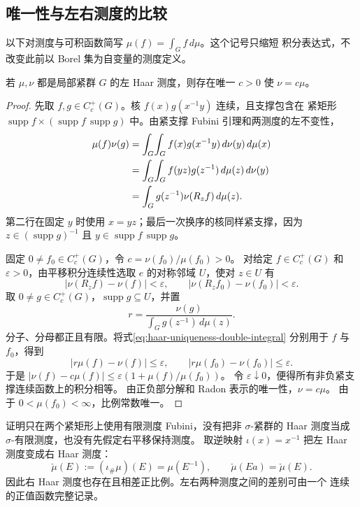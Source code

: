\subsection{唯一性与左右测度的比较}

以下对测度与可积函数简写 $\mu(f)=\int_G f\,d\mu$。这个记号只缩短
积分表达式，不改变此前以 Borel 集为自变量的测度定义。

\begin{theorem}
\label{thm:haar-uniqueness}
若 $\mu,\nu$ 都是局部紧群 $G$ 的左 Haar 测度，则存在唯一 $c>0$
使 $\nu=c\mu$。
\end{theorem}

\begin{proof}
先取 $f,g\in C_c^+(G)$。核 $f(x)g(x^{-1}y)$ 连续，且支撑包含在
紧矩形
$\operatorname{supp}f\times(\operatorname{supp}f\,\operatorname{supp}g)$
中。由紧支撑 Fubini 引理和两测度的左不变性，
\begin{align}
 \mu(f)\nu(g)
 &=\int_G\!\int_G f(x)g(x^{-1}y)\,d\nu(y)\,d\mu(x)\notag\\
 &=\int_G\!\int_G f(yz)g(z^{-1})\,d\mu(z)\,d\nu(y)\notag\\
 &=\int_G g(z^{-1})\nu(R_zf)\,d\mu(z).
 \label{eq:haar-uniqueness-double-integral}
\end{align}
第二行在固定 $y$ 时使用 $x=yz$；最后一次换序的核同样紧支撑，因为
$z\in(\operatorname{supp}g)^{-1}$ 且
$y\in\operatorname{supp}f\,\operatorname{supp}g$。

固定 $0\ne f_0\in C_c^+(G)$，令 $c=\nu(f_0)/\mu(f_0)>0$。
对给定 $f\in C_c^+(G)$ 和 $\varepsilon>0$，由平移积分连续性选取
$e$ 的对称邻域 $U$，使对 $z\in U$ 有
\[
 |\nu(R_zf)-\nu(f)|<\varepsilon,
 \qquad |\nu(R_zf_0)-\nu(f_0)|<\varepsilon.
\]
取 $0\ne g\in C_c^+(G)$，$\operatorname{supp}g\subseteq U$，并置
\[
 r=\frac{\nu(g)}{\int_G g(z^{-1})\,d\mu(z)}.
\]
分子、分母都正且有限。将式\eqref{eq:haar-uniqueness-double-integral}
分别用于 $f$ 与 $f_0$，得到
\[
 |r\mu(f)-\nu(f)|\le\varepsilon,
 \qquad |r\mu(f_0)-\nu(f_0)|\le\varepsilon.
\]
于是
$|\nu(f)-c\mu(f)|\le\varepsilon(1+\mu(f)/\mu(f_0))$。
令 $\varepsilon\downarrow0$，便得所有非负紧支撑连续函数上的积分相等。
由正负部分解和 Radon 表示的唯一性，$\nu=c\mu$。
由于 $0<\mu(f_0)<\infty$，比例常数唯一。
\end{proof}

证明只在两个紧矩形上使用有限测度 Fubini，没有把非 $\sigma$-紧群的
Haar 测度当成 $\sigma$-有限测度，也没有先假定右平移保持测度。
取逆映射 $\iota(x)=x^{-1}$ 把左 Haar 测度变成右 Haar 测度：
\[
 \check\mu(E):=(\iota_\#\mu)(E)=\mu(E^{-1}),\qquad
 \check\mu(Ea)=\check\mu(E).
\]
因此右 Haar 测度也存在且相差正比例。左右两种测度之间的差别可由一个
连续的正值函数完整记录。

